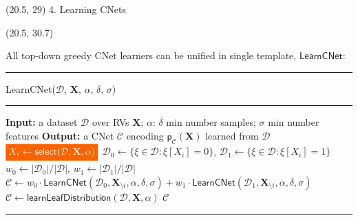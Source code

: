 \documentclass[final]{beamer}
\newcommand{\highlight}[2][yellow]{\mathchoice%
  {\colorbox{#1}{\strut\textcolor{white}{$\displaystyle{#2}$}}}%
  {\colorbox{#1}{\strut\textcolor{white}{$\textstyle{#2}$}}}%
  {\colorbox{#1}{\strut\textcolor{white}{$\scriptstyle{#2}$}}}%
  {\colorbox{#1}{\strut\textcolor{white}{$\scriptscriptstyle{#2}$}}}}%
\begin{document}
\begin{frame}{}
  \begin{textblock}{17.5}(20.5, 29)
    4. Learning CNets
  \end{textblock}
  
  \begin{textblock}{17.5}(20.5, 30.7)
    \small
    
    All top-down greedy CNet learners %
    can be unified in single template, $\mathsf{LearnCNet}$:
 \begin{center}  
  \begin{minipage}{0.9\linewidth}
    \vspace{10pt}
        \scriptsize
        {\hrule\flushleft\textsf{LearnCNet}($\mathcal{D}$, $\mathbf{X}$, $\alpha$,
        $\delta$, $\sigma$)\\\hrule}
  \begin{algorithmic}[1]
    \State \textbf{Input:} a dataset $\mathcal{D}$ over RVs $\mathbf{X}$; $\alpha$: $\delta$
    min number samples; $\sigma$ min number features
    \State  \textbf{Output:}  a CNet $\mathcal{C}$ encoding  $\mathsf{p}_{\mathcal{C}}(\textbf{X})$ learned from $\mathcal D$
    \State $\highlight[gold4]{X_i\leftarrow  \mathsf{select}(\mathcal D, \mathbf X, \alpha)}$
    \State $\mathcal D_0 \leftarrow \{\xi \in \mathcal D: \xi[X_i]=0 \}$, $\mathcal D_1 \leftarrow \{\xi \in \mathcal D: \xi[X_i]=1 \}$
    \State $w_0 \leftarrow |\mathcal D_0| / |\mathcal D|$, $w_1 \leftarrow |\mathcal   D_1| / |\mathcal D|$
    \State $\mathcal{C} \leftarrow
    w_0\cdot\mathsf{LearnCNet}(\mathcal D_0, \mathbf X_{\setminus i},
    \alpha, \delta, \sigma) + w_1 \cdot\mathsf{LearnCNet}(\mathcal D_1, \mathbf X_{\setminus i}, \alpha, \delta, \sigma) $
    \Else 
    \State $\mathcal{C} \leftarrow \mathsf{learnLeafDistribution}(\mathcal D, \mathbf X, \alpha)$
    \EndIf
    \State \Return $\mathcal{C}$
  \end{algorithmic}
  \hrule
  

\end{minipage}
\end{center}
\end{textblock}
\end{frame}
\end{document}
